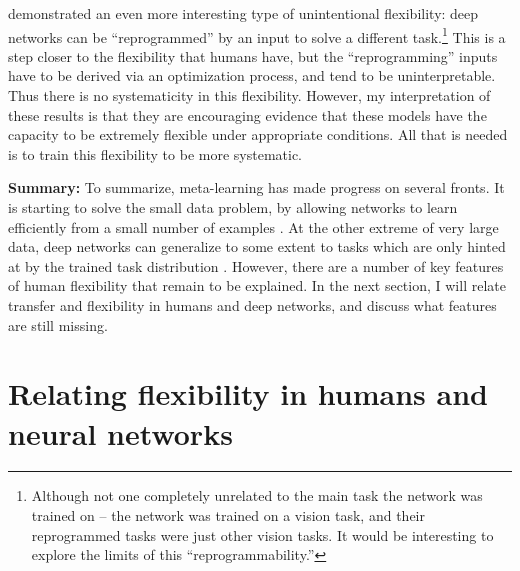 \citet{Elsayed} demonstrated an even more interesting type of unintentional flexibility: deep networks can be ``reprogrammed'' by an input to solve a different task.\footnote{Although not one completely unrelated to the main task the network was trained on -- the network was trained on a vision task, and their reprogrammed tasks were just other vision tasks. It would be interesting to explore the limits of this ``reprogrammability.''} This is a step closer to the flexibility that humans have, but the ``reprogramming'' inputs have to be derived via an optimization process, and tend to be uninterpretable. Thus there is no systematicity in this flexibility. However, my interpretation of these results is that they are encouraging evidence that these models have the capacity to be extremely flexible under appropriate conditions. All that is needed is to train this flexibility to be more systematic. \par  
\textbf{Summary:} To summarize, meta-learning has made progress on several fronts. It is starting to solve the small data problem, by allowing networks to learn efficiently from a small number of examples \citep[e.g.][]{Wang2016a}. At the other extreme of very large data, deep networks can generalize to some extent to tasks which are only hinted at by the trained task distribution \citep[e.g.][]{Radford2019}. However, there are a number of key features of human flexibility that remain to be explained. In the next section, I will relate transfer and flexibility in humans and deep networks, and discuss what features are still missing. \par 



\section{Relating flexibility in humans and neural networks}

